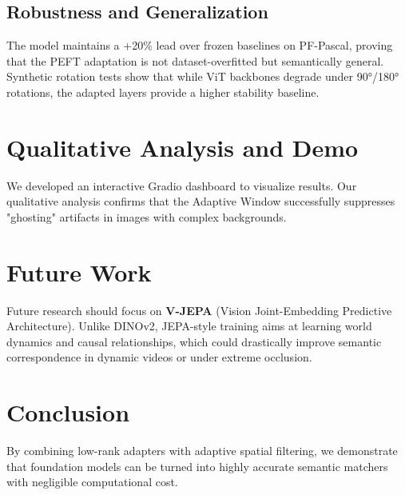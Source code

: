 \documentclass[10pt,twocolumn,letterpaper]{article}
\begin{document}
\subsection{Robustness and Generalization}
The model maintains a +20\% lead over frozen baselines on PF-Pascal, proving that the PEFT adaptation is not dataset-overfitted but semantically general. Synthetic rotation tests show that while ViT backbones degrade under 90°/180° rotations, the adapted layers provide a higher stability baseline.

\section{Qualitative Analysis and Demo}
We developed an interactive Gradio dashboard to visualize results. Our qualitative analysis confirms that the Adaptive Window successfully suppresses "ghosting" artifacts in images with complex backgrounds.

\section{Future Work}
Future research should focus on \textbf{V-JEPA} (Vision Joint-Embedding Predictive Architecture). Unlike DINOv2, JEPA-style training aims at learning world dynamics and causal relationships, which could drastically improve semantic correspondence in dynamic videos or under extreme occlusion.

\section{Conclusion}
By combining low-rank adapters with adaptive spatial filtering, we demonstrate that foundation models can be turned into highly accurate semantic matchers with negligible computational cost.
\end{document}
